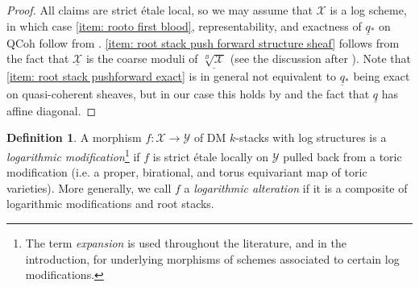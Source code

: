 \documentclass[11pt]{amsart}
\newcommand{\PKHcomment}[1]{{\color{red}PKH: #1}}
\theoremstyle{definition}
\theoremstyle{definition}
\newtheorem{lemma}[theorem]{Lemma}
\newtheorem{definition}[theorem]{Definition}
\newcommand{\cX}{\mathcal{X}}
\newcommand{\cY}{\mathcal{Y}}
\newcommand{\cZ}{\mathcal{Z}}
\newcommand{\ul}[1]{\underline{#1}}
\newcommand{\cal}{\mathcal}
\def\cX{{\cal X}}
\def\cY{{\cal Y}}
\def\cZ{{\cal Z}}
\begin{document}
\begin{proof}
All claims are strict \'etale local, so we may assume that $\mathcal{X}$ is a log scheme, in which case \eqref{item: rooto first blood}, representability, and exactness of $\ul{q}{}_*$ on QCoh follow from \cite[Proposition 4.19]{Parabolic-sheaves-on-logarithmic-schemes}. \eqref{item: root stack push forward structure sheaf} follows from the fact that $\ul{\mathcal{X}}$ is the coarse moduli of $\ul{\!\!\sqrt[B]{\mathcal{X}}}$ (see the discussion after \cite[Remark 3.1]{talpo2018infinite}). Note that \eqref{item: root stack pushforward exact} is in general not equivalent to $\ul{q}{}_*$ being exact on quasi-coherent sheaves, but in our case this holds by \cite[Remark 3.5]{Alper2013GoodModuli} and the fact that $\ul{q}$ has affine diagonal.
\end{proof}
\begin{definition}\label{definition-log-modification}
    A morphism $f\colon\cX\rightarrow\cY$ of DM $k$-stacks with log structures is a \textit{logarithmic modification}\footnote{The term \emph{expansion} is used throughout the literature, and in the introduction, for  underlying morphisms of schemes associated to certain log modifications.} if $f$ is strict \'etale locally on $\cY$ pulled back from a toric modification (i.e. a proper, birational, and torus equivariant map of toric varieties). More generally, we call $f$ a \textit{logarithmic alteration} if it is a composite of logarithmic modifications and root stacks.
\end{definition}
\end{document}
